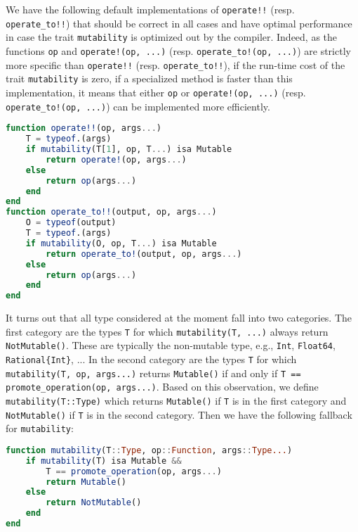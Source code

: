 \documentclass{juliacon}
\begin{document}
We have the following default implementations of \lstinline|operate!!| (resp. \lstinline|operate_to!!|) that should be correct in all cases and have optimal performance in case the trait \lstinline|mutability| is optimized out by the compiler.
Indeed, as the functions \lstinline|op| and \lstinline|operate!(op, ...)| (resp. \lstinline|operate_to!(op, ...)|) are strictly more specific than \lstinline|operate!!| (resp. \lstinline|operate_to!!|),
if the run-time cost of the trait \lstinline|mutability| is zero,
if a specialized method is faster than this implementation,
it means that either
\lstinline|op| or \lstinline|operate!(op, ...)| (resp. \lstinline|operate_to!(op, ...)|)
can be implemented more efficiently.
\begin{lstlisting}[language = Julia]
function operate!!(op, args...)
    T = typeof.(args)
    if mutability(T[1], op, T...) isa Mutable
        return operate!(op, args...)
    else
        return op(args...)
    end
end
function operate_to!!(output, op, args...)
    O = typeof(output)
    T = typeof.(args)
    if mutability(O, op, T...) isa Mutable
        return operate_to!(output, op, args...)
    else
        return op(args...)
    end
end
\end{lstlisting}

It turns out that all type considered at the moment fall into two categories.
The first category are the types \lstinline|T| for which
\lstinline|mutability(T, ...)| always return \lstinline|NotMutable()|.
These are typically the non-mutable type, e.g., \lstinline|Int|, \lstinline|Float64|, \lstinline|Rational{Int}|, ...
In the second category are the types \lstinline|T| for which
\lstinline|mutability(T, op, args...)| returns \lstinline|Mutable()|
if and only if \lstinline|T == promote_operation(op, args...)|.
Based on this observation, we define \lstinline|mutability(T::Type)| which
returns \lstinline|Mutable()| if \lstinline|T| is in the first category
and \lstinline|NotMutable()| if \lstinline|T| is in the second category.
Then we have the following fallback for \lstinline|mutability|:
\begin{lstlisting}[language = Julia]
function mutability(T::Type, op::Function, args::Type...)
    if mutability(T) isa Mutable &&
        T == promote_operation(op, args...)
        return Mutable()
    else
        return NotMutable()
    end
end
\end{lstlisting}


\end{document}
